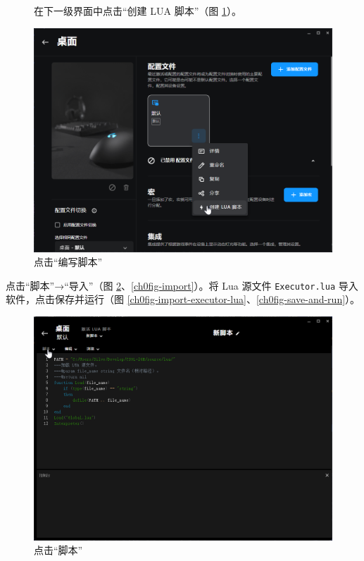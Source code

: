 \begin{figure}[H]
    \Centering
    \parbox[l]{\textwidth}{在下一级界面中点击“创建 LUA 脚本”（图 \ref{ch0fig-script}）。}
    \includegraphics[width=\textwidth]{assets/intro/script.png}
    \caption{点击“编写脚本”}
    \label{ch0fig-script}
\end{figure}

点击“脚本”→“导入”（图 \ref{ch0fig-edit}、\ref{ch0fig-import}）。将 Lua 源文件 \lstinline{Executor.lua} 导入软件，点击保存并运行（图 \ref{ch0fig-import-executor-lua}、\ref{ch0fig-save-and-run}）。

\begin{figure}[H]
    \Centering
    \includegraphics[width=\textwidth]{assets/intro/edit.png}
    \caption{点击“脚本”}
    \label{ch0fig-edit}
\end{figure}

